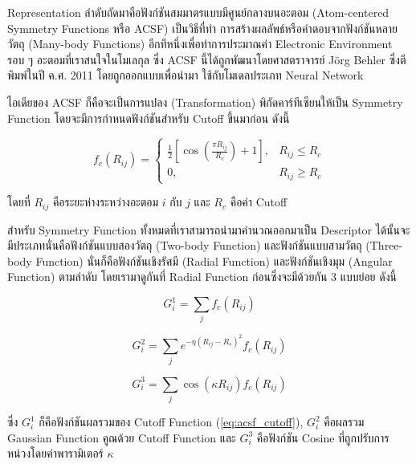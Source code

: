 Representation ลำดับถัดมาคือฟังก์ชันสมมาตรแบบมีศูนย์กลางบนอะตอม (Atom-centered Symmetry Functions หรือ ACSF) เป็นวิธีที่ทำ%
การสร้างผลลัพธ์หรือคำตอบจากฟังก์ชันหลายวัตถุ (Many-body Functions) อีกทีหนึ่งเพื่อทำการประมาณค่า Electronic Environment รอบ ๆ 
อะตอมที่เราสนใจในโมเลกุล ซึ่ง ACSF นี้ได้ถูกพัฒนาโดยศาสตราจารย์ J\"{o}rg Behler ซึ่งตีพิมพ์ในปี ค.ศ. 2011 โดยถูกออกแบบเพื่อนำมา%
ใช้กับโมเดลประเภท Neural Network \autocite{behler2011a}

ไอเดียของ ACSF ก็คือจะเป็นการแปลง (Transformation) พิกัดคาร์ทีเซียนให้เป็น Symmetry Function โดยจะมีการกำหนดฟังก์ชันสำหรับ 
Cutoff ขึ้นมาก่อน ดังนี้

\begin{equation}\label{eq:acsf_cutoff}
    f_{c}(R_{ij}) = 
    \begin{cases}
        \frac{1}{2} \left[\cos(\frac{\textstyle \pi R_{ij}}{\textstyle R_{c}}) + 1 \right], & R_{ij} \le R_{c} \\
        0, & R_{ij} \ge R_{c}
    \end{cases}
\end{equation}

\noindent โดยที่ $R_{ij}$ คือระยะห่างระหว่างอะตอม $i$ กับ $j$ และ $R_{c}$ คือค่า Cutoff

สำหรับ Symmetry Function ทั้งหมดที่เราสามารถนำมาคำนวณออกมาเป็น Descriptor ได้นั้นจะมีประเภทนั่นคือฟังก์ชันแบบสองวัตถุ
(Two-body Function) และฟังก์ชันแบบสามวัตถุ (Three-body Function) นั่นก็คือฟังก์ชันเชิงรัศมี (Radial Function) และฟังก์ชันเชิงมุม 
(Angular Function) ตามลำดับ โดยเรามาดูกันที่ Radial Function ก่อนซึ่งจะมีด้วยกัน 3 แบบย่อย ดังนี้

\begin{equation}\label{eq:rf_g1}
    G^{1}_{i} = \sum_{j} f_{c}(R_{ij})
\end{equation}

\begin{equation}\label{eq:rf_g2}
    G^{2}_{i} = \sum_{j} e^{-\eta(R_{ij} - R_{s})^{2}} f_{c}(R_{ij})
\end{equation}

\begin{equation}\label{eq:rf_g3}
    G^{3}_{i} = \sum_{j} \cos(\kappa R_{ij}) f_{c}(R_{ij})
\end{equation}

\noindent ซึ่ง $G^{1}_{i}$ ก็คือฟังก์ชันผลรวมของ Cutoff Function (\ref{eq:acsf_cutoff}), $G^{2}_{i}$ คือผลรวม Gaussian 
Function คูณด้วย Cutoff Function และ $G^{3}_{i}$ คือฟังก์ชัน Cosine ที่ถูกปรับการหน่วงโดยค่าพารามิเตอร์ $\kappa$ 

